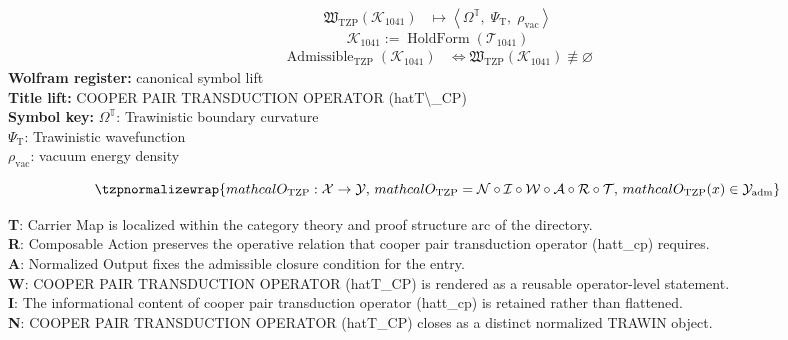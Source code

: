 \noindent
\begin{minipage}[t]{0.48\linewidth}
\begingroup
\small
\[
\begin{aligned}
\mathfrak{W}_{\mathrm{TZP}}\!\left(\mathcal{K}_{1041}\right)
&\longmapsto
\left\langle \Omega^{\mathbb{T}},\; \Psi_{\mathrm{T}},\; \rho_{\mathrm{vac}} \right\rangle
\end{aligned}
\]
\[
\mathcal{K}_{1041}
:=
\operatorname{HoldForm}\!\left(\mathcal{T}_{1041}\right)
\]
\[
\begin{aligned}
\operatorname{Admissible}_{\mathrm{TZP}}\!\left(\mathcal{K}_{1041}\right)
&\Longleftrightarrow
\mathfrak{W}_{\mathrm{TZP}}\!\left(\mathcal{K}_{1041}\right)\not\equiv\varnothing
\end{aligned}
\]
\textbf{Wolfram register:} canonical symbol lift\\
\textbf{Title lift:} COOPER PAIR TRANSDUCTION OPERATOR (hatT\textbackslash{}\_CP)\\
\textbf{Symbol key:} \(\Omega^{\mathbb{T}}\): Trawinistic boundary curvature\\ \(\Psi_{\mathrm{T}}\): Trawinistic wavefunction\\ \(\rho_{\mathrm{vac}}\): vacuum energy density
\par
\endgroup
\end{minipage}\hfill
\begin{minipage}[t]{0.48\linewidth}
\[
\tzpnormalizewrap{mathcal{O}_{\mathrm{TZP}} : \mathcal{X} \to \mathcal{Y},\,mathcal{O}_{\mathrm{TZP}} = \mathcal{N}\circ \mathcal{I}\circ \mathcal{W}\circ \mathcal{A}\circ \mathcal{R}\circ \mathcal{T},\,mathcal{O}_{\mathrm{TZP}}(x) \in \mathcal{Y}_{\mathrm{adm}}}
\]

\small
\textbf{T}: Carrier Map is localized within the category theory and proof structure arc of the directory.\\
\textbf{R}: Composable Action preserves the operative relation that cooper pair transduction operator (hatt\_cp) requires.\\
\textbf{A}: Normalized Output fixes the admissible closure condition for the entry.\\
\textbf{W}: COOPER PAIR TRANSDUCTION OPERATOR (hatT\_CP) is rendered as a reusable operator-level statement.\\
\textbf{I}: The informational content of cooper pair transduction operator (hatt\_cp) is retained rather than flattened.\\
\textbf{N}: COOPER PAIR TRANSDUCTION OPERATOR (hatT\_CP) closes as a distinct normalized TRAWIN object.
\normalsize
\end{minipage}

